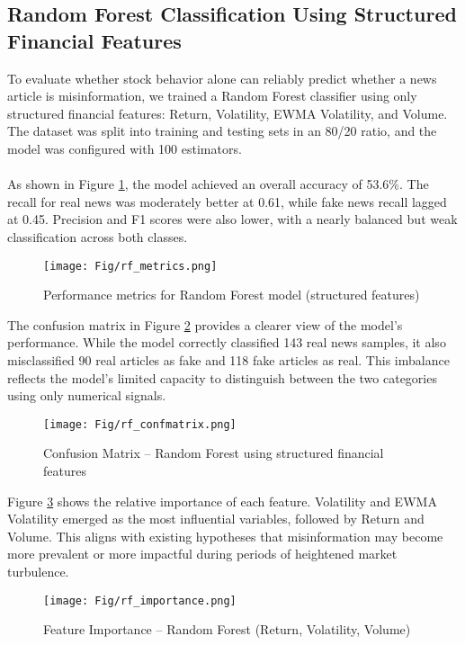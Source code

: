 \documentclass{article}
\begin{document}
\subsection{Random Forest Classification Using Structured Financial Features}

To evaluate whether stock behavior alone can reliably predict whether a news article is misinformation, we trained a Random Forest classifier using only structured financial features: Return, Volatility, EWMA Volatility, and Volume. The dataset was split into training and testing sets in an 80/20 ratio, and the model was configured with 100 estimators. 
\\\\
As shown in Figure \ref{fig:rf_metrics}, the model achieved an overall accuracy of 53.6\%. The recall for real news was moderately better at 0.61, while fake news recall lagged at 0.45. Precision and F1 scores were also lower, with a nearly balanced but weak classification across both classes.

\begin{figure}[H]
    \centering
    \texttt{[image: Fig/rf\_metrics.png]}
    \caption{Performance metrics for Random Forest model (structured features)}
    \label{fig:rf_metrics}
\end{figure}

The confusion matrix in Figure \ref{fig:rf_confmatrix} provides a clearer view of the model’s performance. While the model correctly classified 143 real news samples, it also misclassified 90 real articles as fake and 118 fake articles as real. This imbalance reflects the model’s limited capacity to distinguish between the two categories using only numerical signals.

\begin{figure}[H]
    \centering
    \texttt{[image: Fig/rf\_confmatrix.png]}
    \caption{Confusion Matrix – Random Forest using structured financial features}
    \label{fig:rf_confmatrix}
\end{figure}

Figure \ref{fig:rf_importance} shows the relative importance of each feature. Volatility and EWMA Volatility emerged as the most influential variables, followed by Return and Volume. This aligns with existing hypotheses that misinformation may become more prevalent or more impactful during periods of heightened market turbulence.

\begin{figure}[H]
    \centering
    \texttt{[image: Fig/rf\_importance.png]}
    \caption{Feature Importance – Random Forest (Return, Volatility, Volume)}
    \label{fig:rf_importance}
\end{figure}
\end{document}

